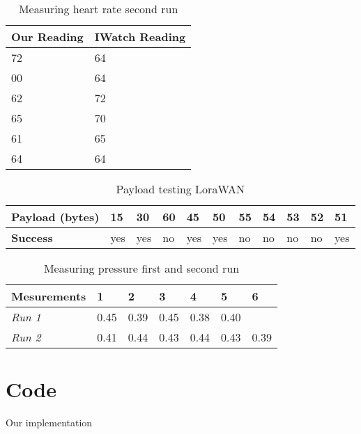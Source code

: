 \begin{table}[h!]
	\centering
	\begin{tabular}{@{}ll@{}}
		\toprule
		\textbf{Our Reading} & \textbf{IWatch Reading} \\ \midrule
		72          & 64             \\
		00          & 64             \\
		62          & 72             \\
		65          & 70             \\
		61          & 65      		 \\      
		64          & 64			 \\ \bottomrule
	\end{tabular}
	\caption[Measuring heart rate second run]{Measuring heart rate second run}
	\label{tab:HeartRateSecond}
\end{table}

\begin{table}[h!]
	\centering
	\begin{tabular}{@{}lllllllllll@{}}
		\toprule
		\textbf{Payload (bytes)} & 15  & 30  & 60 & 45  & 50  & 55 & 54 & 53 & 52 & 51  \\ \midrule
		\textbf{Success} & yes & yes & no & yes & yes & no & no & no & no & yes \\ \bottomrule
	\end{tabular}
	\caption[Payload testing LoraWAN]{Payload testing LoraWAN}
	\label{tab:LoraWanPayload}
\end{table}


\begin{table}[h!]
	\centering
	\begin{tabular}{@{}lllllll@{}}
		\toprule
		\textbf{Mesurements} & \textbf{1} & \textbf{2} & \textbf{3} & \textbf{4} & \textbf{5} & \textbf{6} \\ \midrule
		\textit{Run 1} & 0.45 & 0.39 & 0.45 & 0.38 & 0.40 &  \\
		\textit{Run 2} & 0.41 & 0.44 & 0.43 & 0.44 & 0.43 & 0.39 \\ \bottomrule
	\end{tabular}
	\caption[Measuring pressure first and second run]{Measuring pressure first and second run}
	\label{tab:PressureData}
\end{table}

\section{Code}
Our implementation

